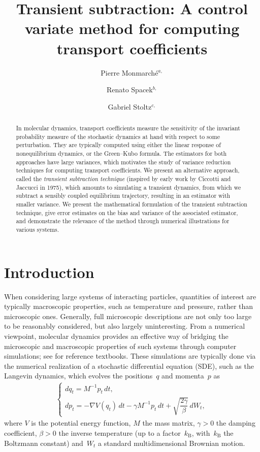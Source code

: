 \documentclass[11pt]{article}
\title{Transient subtraction: A control variate method for computing transport coefficients}
\author[1]{Pierre Monmarch\'e$^{a,}$}
\author[2,3]{Renato Spacek$^{b,}$}
\author[3,2]{Gabriel Stoltz$^{c,}$}
\affil[ ]{\footnotesize $^a$\email{pierre.monmarche@sorbonne-universite.fr},
                        $^b$\email{renato.spacek@enpc.fr},
                        $^c$\email{gabriel.stoltz@enpc.fr}}
\affil[1]{\footnotesize LJLL and LCT, Sorbonne Universit\'e, Paris, France}
\affil[2]{\footnotesize MATHERIALS team, Inria Paris, France}
\affil[3]{\footnotesize CERMICS, \'Ecole des Ponts, France}
\theoremstyle{definition}
\begin{document}
\maketitle

\begin{abstract}
In molecular dynamics, transport coefficients measure the sensitivity of the invariant probability measure of the stochastic dynamics at hand with respect to some perturbation. They are typically computed using either the linear response of nonequilibrium dynamics, or the Green--Kubo formula. The estimators for both approaches have large variances, which motivates the study of variance reduction techniques for computing transport coefficients. We present an alternative approach, called the \emph{transient subtraction technique} (inspired by early work by Ciccotti and Jaccucci in 1975), which amounts to simulating a transient dynamics, from which we subtract a sensibly coupled equilibrium trajectory, resulting in an estimator with smaller variance. We present the mathematical formulation of the transient subtraction technique, give error estimates on the bias and variance of the associated estimator, and demonstrate the relevance of the method through numerical illustrations for various systems.
\end{abstract}

\section{Introduction}
\label{sec:introduction}
When considering large systems of interacting particles, quantities of interest are typically macroscopic properties, such as temperature and pressure, rather than microscopic ones. Generally, full microscopic descriptions are not only too large to be reasonably considered, but also largely uninteresting. From a numerical viewpoint, molecular dynamics provides an effective way of bridging the microscopic and macroscopic properties of such systems through computer simulations; see \cite{tuckerman2010, leimkuhler2015,allen2017} for reference textbooks. These simulations are typically done via the numerical realization of a stochastic differential equation (SDE), such as the Langevin dynamics, which evolves the positions~$q$ and momenta~$p$ as
\begin{equation}
\begin{aligned}
\begin{cases}
    dq_t = M^{-1} p_t \, dt, \\
    dp_t = -\nabla V(q_t) \, dt - \gamma M^{-1} p_t \, dt + \sqrt{\dfrac{2\gamma}{\beta}} \, dW_t,
    \label{eq:lang_dynamics}
\end{cases}
\end{aligned}
\end{equation}
where $V$ is the potential energy function, $M$ the mass matrix, $\gamma>0$ the damping coefficient, $\beta>0$ the inverse temperature (up to a factor~$k_\mathrm{B}$, with~$k_\mathrm{B}$ the Boltzmann constant) and~$W_t$ a standard multidimensional Brownian motion.
\end{document}
